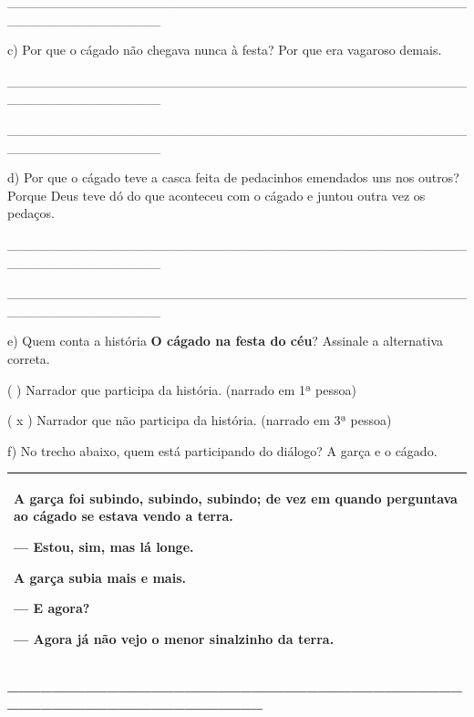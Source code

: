 \_\_\_\_\_\_\_\_\_\_\_\_\_\_\_\_\_\_\_\_\_\_\_\_\_\_\_\_\_\_\_\_\_\_\_\_\_\_\_\_\_\_\_\_\_\_\_\_\_\_\_\_\_\_\_\_\_\_\_\_\_\_\_\_

c) Por que o cágado não chegava nunca à festa? Por que era vagaroso
demais.

\protect\hypertarget{_Hlk127856302}{}{}\_\_\_\_\_\_\_\_\_\_\_\_\_\_\_\_\_\_\_\_\_\_\_\_\_\_\_\_\_\_\_\_\_\_\_\_\_\_\_\_\_\_\_\_\_\_\_\_\_\_\_\_\_\_\_\_\_\_\_\_\_\_\_\_

\_\_\_\_\_\_\_\_\_\_\_\_\_\_\_\_\_\_\_\_\_\_\_\_\_\_\_\_\_\_\_\_\_\_\_\_\_\_\_\_\_\_\_\_\_\_\_\_\_\_\_\_\_\_\_\_\_\_\_\_\_\_\_\_

d) Por que o cágado teve a casca feita de pedacinhos emendados uns nos
outros? Porque Deus teve dó do que aconteceu com o cágado e juntou outra
vez os pedaços.

\_\_\_\_\_\_\_\_\_\_\_\_\_\_\_\_\_\_\_\_\_\_\_\_\_\_\_\_\_\_\_\_\_\_\_\_\_\_\_\_\_\_\_\_\_\_\_\_\_\_\_\_\_\_\_\_\_\_\_\_\_\_\_\_

\_\_\_\_\_\_\_\_\_\_\_\_\_\_\_\_\_\_\_\_\_\_\_\_\_\_\_\_\_\_\_\_\_\_\_\_\_\_\_\_\_\_\_\_\_\_\_\_\_\_\_\_\_\_\_\_\_\_\_\_\_\_\_\_

e) Quem conta a história \textbf{O cágado na festa do céu}? Assinale a
alternativa correta.

( ) Narrador que participa da história. (narrado em 1ª pessoa)

( x ) Narrador que não participa da história. (narrado em 3ª pessoa)

f) No trecho abaixo, quem está participando do diálogo? A garça e o
cágado.

\begin{longtable}[]{@{}l@{}}
\toprule
\begin{minipage}[t]{0.97\columnwidth}\raggedright\strut
A garça foi subindo, subindo, subindo; de vez em quando perguntava ao
cágado se estava vendo a terra.

--- Estou, sim, mas lá longe.

A garça subia mais e mais.

--- E agora?

--- Agora já não vejo o menor sinalzinho da terra.\strut
\end{minipage}\tabularnewline
\bottomrule
\end{longtable}

\protect\hypertarget{_Hlk127806075}{}{}\textbf{\_\_\_\_\_\_\_\_\_\_\_\_\_\_\_\_\_\_\_\_\_\_\_\_\_\_\_\_\_\_\_\_\_\_\_\_\_\_\_\_\_\_\_\_\_\_\_\_\_\_\_\_\_\_\_\_\_\_\_\_\_\_\_\_}

